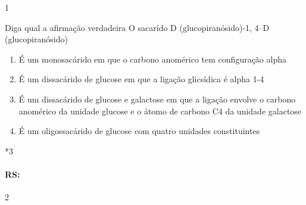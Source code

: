 \documentclass[\mainfilename]{subfiles}
\begin{document}
\setcounter{question}{12}
\begin{questionBox}1{}
    
    Diga qual a afirmação verdadeira
    O sacarído \chemalpha D (glucopiranósido)-1, 4--D (glucopiranósido)

    \begin{enumerate}
        \item É um monosacárido em que o carbono anomérico tem configuração alpha
        \item É um dissacárido de glucose em que a ligação glicsídica é alpha 1-4
        \item É um dissacárido de glucose e galactose em que a ligação envolve o carbono anomérico da unidade glucose e o átomo de carbono C4 da unidade galactose
        \item É um oligossacárido de glucose com quatro unidades constituintes
    \end{enumerate}

    \begin{questionBox}*3{}
        
        
        
    \end{questionBox}

    \paragraph{RS:} 2
    
\end{questionBox}
\end{document}
